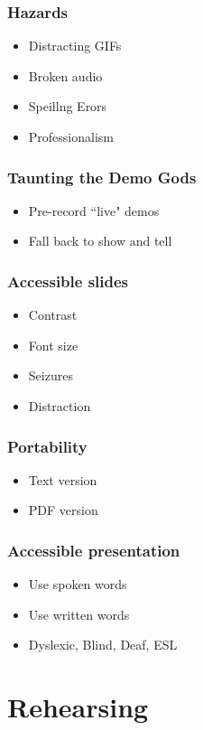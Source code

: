 \documentclass{beamer}
\begin{document}
\begin{frame}[fragile]
\frametitle{Hazards}
\begin{itemize}[<+(1)->]
\item Distracting GIFs
\item Broken audio
\item Speillng Erors
\item Professionalism
\end{itemize}
\end{frame}

\begin{frame}[fragile]
\frametitle{Taunting the Demo Gods}
\begin{itemize}[<+(1)->]
\item Pre-record ``live" demos
\item Fall back to show and tell
\end{itemize}
\end{frame}

\begin{frame}[fragile]
\frametitle{Accessible slides}
\begin{itemize}[<+(1)->]
\item Contrast
\item Font size
\item Seizures
\item Distraction
\end{itemize}
\end{frame}

\begin{frame}[fragile]
\frametitle{Portability}
\begin{itemize}[<+(1)->]
\item Text version
\item PDF version
\end{itemize}
\end{frame}

\begin{frame}[fragile]
\frametitle{Accessible presentation}
\begin{itemize}[<+(1)->]
\item Use spoken words
\item Use written words
\item Dyslexic, Blind, Deaf, ESL
\end{itemize}
\end{frame}

\section{Rehearsing}
\end{document}
